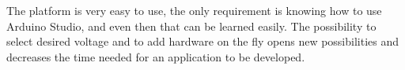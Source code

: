 The platform is very easy to use, the only requirement is knowing how to use Arduino Studio, and
even then that can be learned easily. The possibility to select desired voltage and to add hardware on
the fly opens new possibilities and decreases the time needed for an application to be developed.

